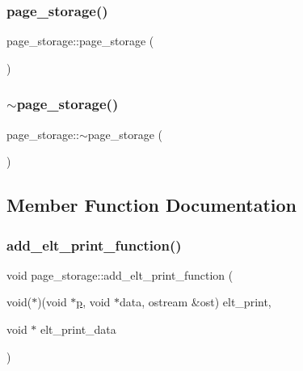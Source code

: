 \subsubsection{\texorpdfstring{page\+\_\+storage()}{page\_storage()}}
{\footnotesize\ttfamily page\+\_\+storage\+::page\+\_\+storage (\begin{DoxyParamCaption}{ }\end{DoxyParamCaption})}

\mbox{\label{classpage__storage_a95391dd4f65d2d28da77553fcaaa2afc}} 
\subsubsection{\texorpdfstring{$\sim$page\+\_\+storage()}{~page\_storage()}}
{\footnotesize\ttfamily page\+\_\+storage\+::$\sim$page\+\_\+storage (\begin{DoxyParamCaption}{ }\end{DoxyParamCaption})}



\subsection{Member Function Documentation}
\mbox{\label{classpage__storage_a7f239203bcb8c74f628993ea03c5d996}} 
\subsubsection{\texorpdfstring{add\+\_\+elt\+\_\+print\+\_\+function()}{add\_elt\_print\_function()}}
{\footnotesize\ttfamily void page\+\_\+storage\+::add\+\_\+elt\+\_\+print\+\_\+function (\begin{DoxyParamCaption}\item[{void($\ast$)(void $\ast$\mbox{\hyperlink{alphabet2_8_c_a533391314665d6bf1b5575e9a9cd8552}{p}}, void $\ast$data, ostream \&ost)}]{elt\+\_\+print,  }\item[{void $\ast$}]{elt\+\_\+print\+\_\+data }\end{DoxyParamCaption})}

